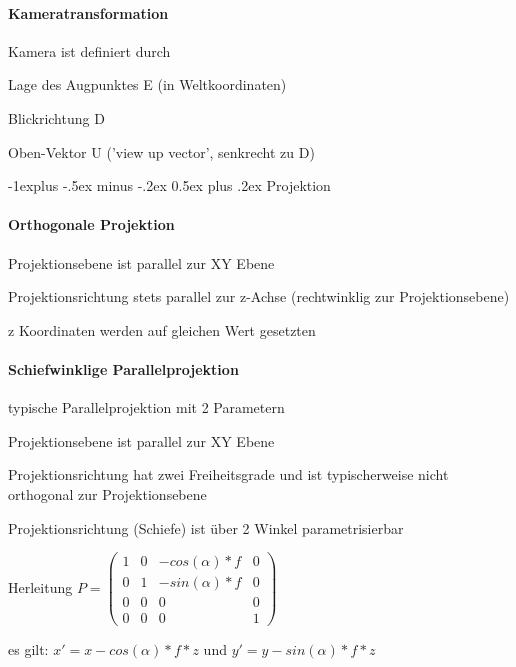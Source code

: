 \documentclass[landscape]{article}
\makeatletter
\renewcommand{\subsection}{\@startsection{subsection}{2}{0mm}%
                                {-1explus -.5ex minus -.2ex}%
                                {0.5ex plus .2ex}%
                                {\normalfont\normalsize\bfseries}}
\makeatother
\begin{document}
\begin{multicols}{3}
  \paragraph{Kameratransformation}
  Kamera ist definiert durch
  \begin{itemize*}
    \item Lage des Augpunktes E (in Weltkoordinaten)
    \item Blickrichtung D
    \item Oben-Vektor U ('view up vector', senkrecht zu D)
  \end{itemize*}
  
  \subsection{Projektion}
  \paragraph{Orthogonale Projektion}
  \begin{itemize*}
    \item Projektionsebene ist parallel zur XY Ebene
    \item Projektionsrichtung stets parallel zur z-Achse (rechtwinklig zur Projektionsebene)
    \item z Koordinaten werden auf gleichen Wert gesetzten
  \end{itemize*}
  
  \paragraph{Schiefwinklige Parallelprojektion}
  \begin{itemize*}
    \item typische Parallelprojektion mit 2 Parametern
    \item Projektionsebene ist parallel zur XY Ebene
    \item Projektionsrichtung hat zwei Freiheitsgrade und ist typischerweise nicht orthogonal zur Projektionsebene
    \item Projektionsrichtung (Schiefe) ist über 2 Winkel parametrisierbar
    \item Herleitung $P=\begin{pmatrix}
        1 & 0 & -cos(\alpha)*f & 0  \\
        0 & 1 & -sin(\alpha)*f & 0  \\
        0 & 0 & 0              & 0  \\
        0 & 0 & 0              & 1 
      \end{pmatrix}$
    \item es gilt: $x'=x-cos(\alpha)*f*z$ und $y'=y-sin(\alpha)*f*z$
  \end{itemize*}
  

\end{multicols}
\end{document}
